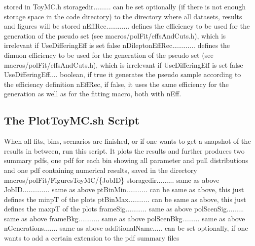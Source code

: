 \documentclass{article}
\begin{document}
stored in ToyMC.h
\newline storagedir......... can be set optionally (if there is not enough storage space in the code directory) to the directory where all datasets, results and figures will be stored
\newline nEffRec............ defines the efficiency to be used for the
generation of the pseudo set (see macros/polFit/effsAndCuts.h), which is irrelevant if UseDifferingEff is set false
\newline nDileptonEffRec............ defines the dimuon efficiency to be used for the
generation of the pseudo set (see macros/polFit/effsAndCuts.h), which is irrelevant if UseDifferingEff is set false
\newline UseDifferingEff.... boolean, if true it generates the pseudo sample
according to the efficiency definition nEffRec, if false, it uses the same
efficiency for the generation as well as for the fitting macro, both with nEff.



\subsection{The PlotToyMC.sh Script}

When all fits, bins, scenarios are finished, or if one wants to get a snapshot of the
results in between, run this script. It plots the results and
further produces two summary pdfs, one pdf for each bin showing all parameter and pull
distributions and one pdf containing numerical results, saved in the directory macros/polFit/FiguresToyMC/\{JobID\}
\newline storagedir......... same as above
\newline JobID.............. same as above
\newline ptBinMin........... can be same as above, this just defines the minpT of the plots
\newline ptBinMax........... can be same as above, this just defines the maxpT of the plots
\newline frameSig........... same as above
\newline polScenSig......... same as above
\newline frameBkg........... same as above
\newline polScenBkg......... same as above
\newline nGenerations....... same as above
\newline additionalName..... can be set optionally, if one wants to add a certain extension to the pdf summary files
\end{document}
